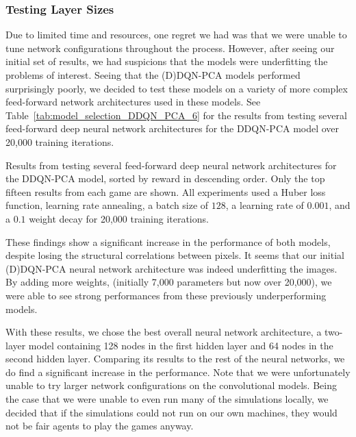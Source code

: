 \documentclass[11pt]{article}
\begin{document}
\subsubsection{Testing Layer Sizes}

Due to limited time and resources, one regret we had was that we were unable to tune network configurations throughout the process. However, after seeing our initial set of results, we had suspicions that the models were underfitting the problems of interest. Seeing that the (D)DQN-PCA models performed surprisingly poorly, we decided to test these models on a variety of more complex feed-forward network architectures used in these models. See Table~\ref{tab:model_selection_DDQN_PCA_6} for the results from testing several feed-forward deep neural network architectures for the DDQN-PCA model over 20,000 training iterations.

\begin{table}[!ht]
    \footnotesize
    \centering
    
    
    \caption{Results from testing several feed-forward deep neural network architectures for the DDQN-PCA model, sorted by reward in descending order. Only the top fifteen results from each game are shown. All experiments used a Huber loss function, learning rate annealing, a batch size of $128$, a learning rate of $0.001$, and a $0.1$ weight decay for 20,000 training iterations.}
    \label{tab:model_selection_DDQN_PCA_6}
\end{table}

These findings show a significant increase in the performance of both models, despite losing the structural correlations between pixels. It seems that our initial (D)DQN-PCA neural network architecture was indeed underfitting the images. By adding more weights, (initially 7,000 parameters but now over 20,000), we were able to see strong performances from these previously underperforming models.

With these results, we chose the best overall neural network architecture, a two-layer model containing 128 nodes in the first hidden layer and 64 nodes in the second hidden layer. Comparing its results to the rest of the neural networks, we do find a significant increase in the performance. Note that we were unfortunately unable to try larger network configurations on the convolutional models. Being the case that we were unable to even run many of the simulations locally, we decided that if the simulations could not run on our own machines, they would not be fair agents to play the games anyway.
\end{document}
